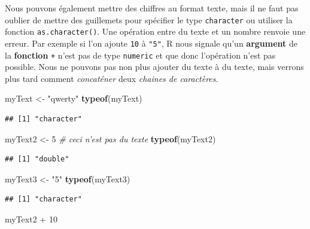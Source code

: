 \documentclass[twoside,symmetric]{book}
\newenvironment{Shaded}{}{}
\newcommand{\CommentTok}[1]{\textit{#1}}
\newcommand{\DecValTok}[1]{#1}
\newcommand{\KeywordTok}[1]{\textbf{#1}}
\newcommand{\NormalTok}[1]{#1}
\newcommand{\OperatorTok}[1]{#1}
\newcommand{\StringTok}[1]{#1}
\begin{document}
Nous pouvons également mettre des chiffres au format texte, mais il ne faut pas oublier de mettre des guillemets pour spécifier le type \texttt{character} ou utiliser la fonction \texttt{as.character()}. Une opération entre du texte et un nombre renvoie une erreur. Par exemple si l'on ajoute \texttt{10} à \texttt{"5"}, R nous signale qu'un \textbf{argument} de la \textbf{fonction} \texttt{+} n'est pas de type \texttt{numeric} et que donc l'opération n'est pas possible. Nous ne pouvons pas non plus ajouter du texte à du texte, mais verrons plus tard comment \emph{concaténer} deux \emph{chaines de caractères}.

\begin{Shaded}
\begin{Highlighting}[]
\NormalTok{myText <-}\StringTok{ "qwerty"}
\KeywordTok{typeof}\NormalTok{(myText)}
\end{Highlighting}
\end{Shaded}

\begin{verbatim}
## [1] "character"
\end{verbatim}

\begin{Shaded}
\begin{Highlighting}[]
\NormalTok{myText2 <-}\StringTok{ }\DecValTok{5} \CommentTok{# ceci n'est pas du texte}
\KeywordTok{typeof}\NormalTok{(myText2)}
\end{Highlighting}
\end{Shaded}

\begin{verbatim}
## [1] "double"
\end{verbatim}

\begin{Shaded}
\begin{Highlighting}[]
\NormalTok{myText3 <-}\StringTok{ "5"}
\KeywordTok{typeof}\NormalTok{(myText3)}
\end{Highlighting}
\end{Shaded}

\begin{verbatim}
## [1] "character"
\end{verbatim}

\begin{Shaded}
\begin{Highlighting}[]
\NormalTok{myText2 }\OperatorTok{+}\StringTok{ }\DecValTok{10}
\end{Highlighting}
\end{Shaded}
\end{document}
